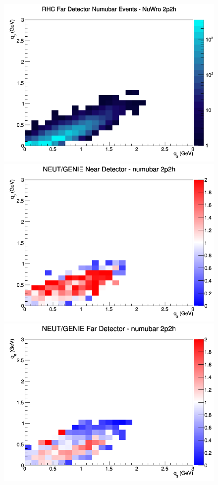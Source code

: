 \documentclass[12pt]{article}
\begin{document}
\begin{figure}[h]
\endminipage
{}
\includegraphics[width=\linewidth]{eff_q0_q3/LAr/2p2h_RHC_FD_numubar_q3_q0_NuWro.png}
\endminipage
\newline
{}
\includegraphics[width=\linewidth]{eff_q0_q3/LAr/ratios/2p2h_NEUT_GENIE_numubar_near_q3_q0.png}
\endminipage
{}
\includegraphics[width=\linewidth]{eff_q0_q3/LAr/ratios/2p2h_NEUT_GENIE_numubar_far_q3_q0.png}

\end{figure}
\end{document}
